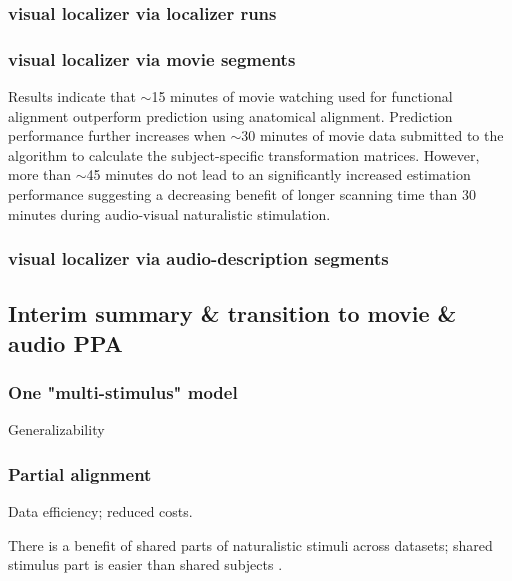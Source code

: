 \subsubsection{visual localizer via localizer runs}


\subsubsection{visual localizer via movie segments}

%
Results indicate that $\sim$15 minutes of movie watching used for functional
alignment outperform prediction using anatomical alignment.
%
Prediction performance further increases when $\sim$30 minutes of movie data
submitted to the algorithm to calculate the subject-specific transformation
matrices.
%
However, more than $\sim$45 minutes do not lead to an significantly increased
estimation performance suggesting a decreasing benefit of longer scanning time
than 30 minutes during audio-visual naturalistic stimulation.


\subsubsection{visual localizer via audio-description segments}



\subsection{Interim summary \& transition to movie \& audio PPA}


\subsubsection{One "multi-stimulus" model}


Generalizability



\subsubsection{Partial alignment}


%
Data efficiency; reduced costs.

%
There is a benefit of shared parts of naturalistic stimuli across datasets;
shared stimulus part is easier than shared subjects
\citep[e.g.][]{zhang2018transfer}.


